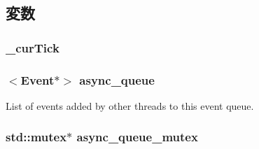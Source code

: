 \subsection{変数}
\hypertarget{classEventQueue_a09b29d670564770f8cde7490c4fa4ebb}{
\subsubsection[{\_\-curTick}]{ {\bf \_\-curTick}}}
\label{classEventQueue_a09b29d670564770f8cde7490c4fa4ebb}
\hypertarget{classEventQueue_a9c9b5322e34950b9d27abca2b8207ca9}{
\subsubsection[{async\_\-queue}]{$<${\bf Event}$\ast$$>$ {\bf async\_\-queue}}}
\label{classEventQueue_a9c9b5322e34950b9d27abca2b8207ca9}


List of events added by other threads to this event queue. \hypertarget{classEventQueue_a7d6bb496422e204e32492a7012a44b66}{
\subsubsection[{async\_\-queue\_\-mutex}]{\setlength{\rightskip}{0pt plus 5cm}std::mutex$\ast$ {\bf async\_\-queue\_\-mutex}}}
\label{classEventQueue_a7d6bb496422e204e32492a7012a44b66}


